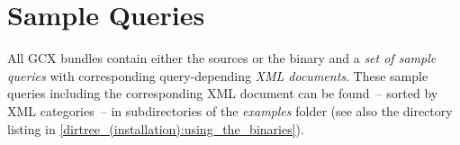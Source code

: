 \section{Sample Queries}
All GCX bundles contain either the sources or the binary and a \emph{set of sample queries} with corresponding query-depending \emph{XML documents}. These sample queries including the corresponding XML document can be found~-- sorted by XML categories~-- in subdirectories of the \emph{examples} folder (see also the directory listing in \autoref{dirtree_(installation):using_the_binaries}). 

